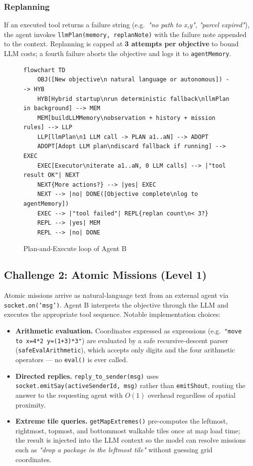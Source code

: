 \documentclass[10pt,a4paper,twocolumn]{article}
\begin{document}
\subsubsection*{Replanning}
If an executed tool returns a failure string (e.g.\ \emph{"no path to x,y"},
\emph{"parcel expired"}), the agent invokes \texttt{llmPlan(memory, replanNote)}
with the failure note appended to the context.  Replanning is capped at
\textbf{3 attempts per objective} to bound LLM costs; a fourth failure aborts
the objective and logs it to \texttt{agentMemory}.

\begin{figure}[H]
\caption{Plan-and-Execute loop of Agent B}
\begin{lstlisting}[language={}]
flowchart TD
    OBJ([New objective\n natural language or autonomous]) --> HYB
    HYB[Hybrid startup\nrun deterministic fallback\nllmPlan in background] --> MEM
    MEM[buildLLMMemory\nobservation + history + mission rules] --> LLP
    LLP[llmPlan\n1 LLM call -> PLAN a1..aN] --> ADOPT
    ADOPT[Adopt LLM plan\ndiscard fallback if running] --> EXEC
    EXEC[Executor\niterate a1..aN, 0 LLM calls] --> |"tool result OK"| NEXT
    NEXT{More actions?} --> |yes| EXEC
    NEXT --> |no| DONE([Objective complete\nlog to agentMemory])
    EXEC --> |"tool failed"| REPL{replan count\n< 3?}
    REPL --> |yes| MEM
    REPL --> |no| DONE
\end{lstlisting}
\end{figure}

\subsection{Challenge 2: Atomic Missions (Level 1)}

Atomic missions arrive as natural-language text from an external agent via
\texttt{socket.on('msg')}.  Agent B interprets the objective through the LLM and
executes the appropriate tool sequence.  Notable implementation choices:

\begin{itemize}[noitemsep]
  \item \textbf{Arithmetic evaluation.}  Coordinates expressed as expressions
        (e.g.\ \texttt{"move to x=4*2 y=(1+3)*3"}) are evaluated by a safe
        recursive-descent parser (\texttt{safeEvalArithmetic}), which accepts
        only digits and the four arithmetic operators — no \texttt{eval()} is
        ever called.
  \item \textbf{Directed replies.}  \texttt{reply\_to\_sender(msg)} uses
        \texttt{socket.emitSay(activeSenderId, msg)} rather than
        \texttt{emitShout}, routing the answer to the requesting agent with
        $O(1)$ overhead regardless of spatial proximity.
  \item \textbf{Extreme tile queries.}  \texttt{getMapExtremes()} pre-computes
        the leftmost, rightmost, topmost, and bottommost walkable tiles once at
        map load time; the result is injected into the LLM context so the model
        can resolve missions such as \emph{"drop a package in the leftmost tile"}
        without guessing grid coordinates.
\end{itemize}
\end{document}
